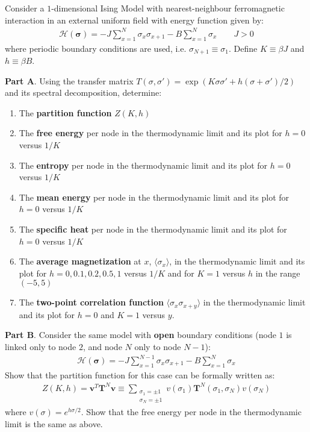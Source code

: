 \documentclass[../../main.tex]{subfiles}
\begin{document}
\begin{exo}
    Consider a $1$-dimensional Ising Model with nearest-neighbour ferromagnetic interaction in an external uniform field with energy function given by:
    \begin{align*}
        \mathcal{H}(\bm{\sigma}) = -J \sum_{x=1}^N \sigma_x \sigma_{x+1} - B \sum_{x=1}^N \sigma_x \qquad J > 0
    \end{align*}    
    where periodic boundary conditions are used, i.e. $\sigma_{N+1} \equiv \sigma_1$. Define $K \equiv \beta J$ and $h \equiv \beta B$.
    
    \medskip
    
    \textbf{Part A}. Using the transfer matrix $T(\sigma, \sigma') = \exp(K \sigma \sigma' + h (\sigma + \sigma')/2)$ and its spectral decomposition, determine:
    \begin{enumerate}
        \item The \textbf{partition function} $Z(K,h)$
        \item The \textbf{free energy} per node in the thermodynamic limit and its plot for $h=0$ versus $1/K$
        \item The \textbf{entropy} per node in the thermodynamic limit and its plot for $h=0$ versus $1/K$
        \item The \textbf{mean energy} per node in the thermodynamic limit and its plot for $h=0$ versus $1/K$
        \item The \textbf{specific heat} per node in the thermodynamic limit and its plot for $h=0$ versus $1/K$
        \item The \textbf{average magnetization} at $x$, $\langle \sigma_x \rangle$, in the thermodynamic limit and its plot for $h=0, 0.1, 0.2, 0.5, 1$ versus $1/K$ and for $K=1$ versus $h$ in the range $(-5,5)$
        \item The \textbf{two-point correlation function} $\langle \sigma_x \sigma_{x+y} \rangle$ in the thermodynamic limit and its plot for $h=0$ and $K=1$ versus $y$.
    \end{enumerate}

    \textbf{Part B}. Consider the same model with \textbf{open} boundary conditions (node $1$ is linked only to node $2$, and node $N$ only to node $N-1$):
    \begin{align*}
        \mathcal{H}(\bm{\sigma}) = -J \sum_{x=1}^{N-1} \sigma_x \sigma_{x+1} - B \sum_{x=1}^N \sigma_x
    \end{align*}   
    Show that the partition function for this case can be formally written as:
    \begin{align*}
        Z(K,h) = \bm{v}^T \textbf{T}^N \bm{v} \equiv \sum_{\substack{\sigma_1 = \pm 1\\ \sigma_N = \pm 1}} v(\sigma_1) \textbf{T}^N(\sigma_1, \sigma_N) v(\sigma_N)  
    \end{align*}
    where $v(\sigma) = e^{h \sigma /2}$. Show that the free energy per node in the thermodynamic limit is the same as above.
    

\end{exo}
\end{document}
